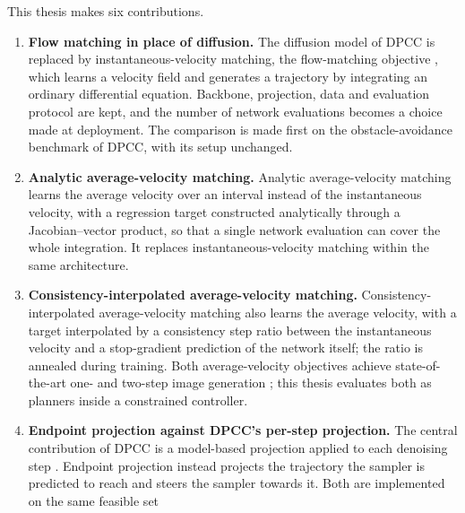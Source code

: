 This thesis makes six contributions.

\begin{enumerate}
  \item \textbf{Flow matching in place of diffusion.} The diffusion model of \ac{DPCC}
    \parencite{romer2025diffusion} is replaced by instantaneous-velocity matching, the flow-matching
    objective \parencite{lipman2023flow,lipman2024guide}, which learns a velocity field and generates a
    trajectory by integrating an ordinary differential equation. Backbone, projection, data and
    evaluation protocol are kept, and the number of network evaluations becomes a choice made at
    deployment. The comparison is made first on
    the obstacle-avoidance benchmark of \ac{DPCC}, with its setup unchanged.
  \item \textbf{Analytic average-velocity matching.} Analytic average-velocity matching
    \parencite{geng2025meanflow} learns the average velocity over an interval instead of the
    instantaneous velocity, with a regression target constructed analytically through a
    Jacobian--vector product, so that a single network evaluation can cover the whole integration. It
    replaces instantaneous-velocity matching within the same architecture.
  \item \textbf{Consistency-interpolated average-velocity matching.} Consistency-interpolated
    average-velocity matching \parencite{zhang2025alphaflow} also learns the average velocity, with a
    target interpolated by a consistency step ratio between the instantaneous velocity and a
    stop-gradient prediction of the network itself; the ratio is annealed during training. Both
    average-velocity objectives achieve state-of-the-art one- and two-step image generation
    \parencite{geng2025meanflow,zhang2025alphaflow}; this thesis evaluates both as planners inside a
    constrained controller.
  \item \textbf{Endpoint projection against DPCC's per-step projection.} The central contribution of
    DPCC is a model-based projection applied to each denoising step \parencite{romer2025diffusion}.
    Endpoint projection \parencite{li2025hardflow} instead projects the trajectory the sampler is
    predicted to reach and steers the sampler towards it. Both are implemented on the same feasible set

\end{enumerate}
